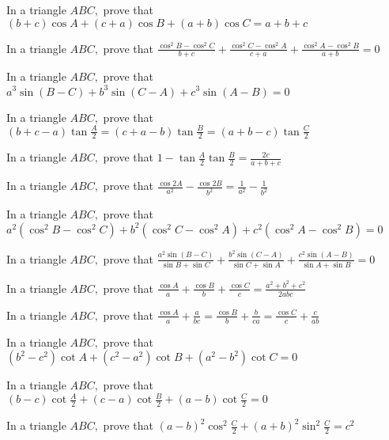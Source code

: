\item In a triangle $ABC,$ prove that $(b + c)\cos A + (c + a)\cos B + (a + b)\cos C = a + b + c$

\item In a triangle $ABC,$ prove that $\frac{\cos^2B - \cos^2C}{b + c} + \frac{\cos^2C - \cos^2A}{c + a} +
    \frac{\cos^2A - \cos^2B}{a + b} = 0$

\item In a triangle $ABC,$ prove that $a^3\sin(B - C) + b^3\sin(C - A) + c^3\sin(A - B) = 0$

\item In a triangle $ABC,$ prove that $(b + c - a)\tan\frac{A}{2} = (c + a - b)\tan\frac{B}{2} = (a + b -
    c)\tan\frac{C}{2}$

\item In a triangle $ABC,$ prove that $1 - \tan\frac{A}{2}\tan\frac{B}{2} = \frac{2c}{a + b + c}$

\item In a triangle $ABC,$ prove that $\frac{\cos2A}{a^2} - \frac{\cos2B}{b^2} = \frac{1}{a^2} - \frac{1}{b^2}$

\item In a triangle $ABC,$ prove that $a^2(\cos^2B - \cos^2C) + b^2(\cos^2C - \cos^2A) + c^2(\cos^2A - \cos^2B) = 0$

\item In a triangle $ABC,$ prove that $\frac{a^2\sin(B - C)}{\sin B + \sin C} + \frac{b^2\sin(C - A)}{\sin C + \sin A} +
    \frac{c^2\sin(A - B)}{\sin A + \sin B} = 0$

\item In a triangle $ABC,$ prove that $\frac{\cos A}{a} + \frac{\cos B}{b} + \frac{\cos C}{c} = \frac{a^2 + b^2 +
    c^2}{2abc}$

\item In a triangle $ABC,$ prove that $\frac{\cos A}{a} + \frac{a}{bc} = \frac{\cos B}{b} + \frac{b}{ca} = \frac{\cos
    C}{c} + \frac{c}{ab}$

\item In a triangle $ABC,$ prove that $(b^2 - c^2)\cot A + (c^2 - a^2)\cot B + (a^2 - b^2)\cot C = 0$

\item In a triangle $ABC,$ prove that $(b - c)\cot\frac{A}{2} + (c - a)\cot\frac{B}{2} + (a - b)\cot\frac{C}{2} = 0$

\item In a triangle $ABC,$ prove that $(a - b)^2\cos^2\frac{C}{2} + (a + b)^2\sin^2\frac{C}{2} = c^2$

